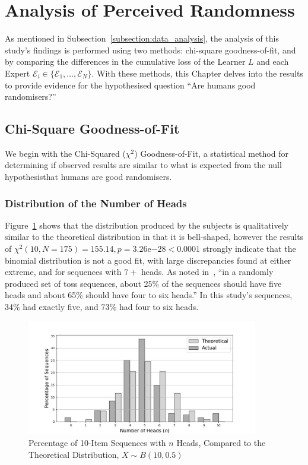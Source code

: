 \section{Analysis of Perceived Randomness}\label{section:analysis_of_perceived_randomness}
As mentioned in Subsection~\ref{subsection:data_analysis}, the analysis of this study's findings is performed using two methods: chi-square goodness-of-fit, and by comparing the differences in the cumulative loss of the Learner $L$ and each Expert $\mathcal{E}_i \in \{\mathcal{E}_1,\ldots, \mathcal{E}_N\}$. With these methods, this Chapter delves into the results to provide evidence for the hypothesised question ``Are humans good randomisers?'' 

\subsection{Chi-Square Goodness-of-Fit}\label{subsection:chi-square_goodness-of-fit}
We begin with the Chi-Squared ($\chi^2$) Goodness-of-Fit, a statistical method for determining if observed results are similar to what is expected from the null hypothesis\textemdash{}that humans are good randomisers.

\subsubsection{Distribution of the Number of Heads}
Figure~\ref{distribution_of_the_number_of_heads} shows that the distribution produced by the subjects is qualitatively similar to the theoretical distribution in that it is bell-shaped, however the results of $\chi^2(10, N=175) = 155.14, p=3.26\mathrm{e}{-28} < 0.0001$ strongly indicate that the binomial distribution is not a good fit, with large discrepancies found at either extreme, and for sequences with $7+$ heads. As noted in~\cite{nickerson:2009}, ``in a randomly produced set of toss sequences, about 25\% of the sequences should have five heads and about 65\% should have four to six heads.'' In this study's sequences, 34\% had exactly five, and 73\% had four to six heads.

\begin{figure}[h]
    \centering
    \includegraphics[width=0.9\textwidth]{images/combined_number_of_heads.jpg}
    \caption{Percentage of 10-Item Sequences with $n$ Heads, Compared to the Theoretical Distribution, $X \sim B(10, 0.5)$}
    \label{distribution_of_the_number_of_heads}
\end{figure}

